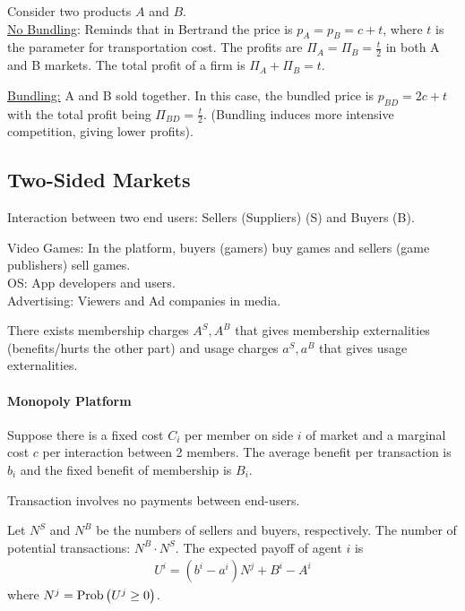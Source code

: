 \documentclass[11pt]{elegantbook}
\begin{document}
Consider two products $A$ and $B$.\\
\underline{No Bundling}: Reminds that in Bertrand the price is $p_A=p_B=c+t$, where $t$ is the parameter for transportation cost. The profits are $\Pi_A=\Pi_B=\frac{t}{2}$ in both A and B markets. The total profit of a firm is $\Pi_A+\Pi_B=t$.

\underline{Bundling:} A and B sold together. In this case, the bundled price is $p_{BD}=2c+t$ with the total profit being $\Pi_{BD}=\frac{t}{2}$. (Bundling induces more intensive competition, giving lower profits).

\subsection{Two-Sided Markets}
Interaction between two end users: Sellers (Suppliers) (S) and Buyers (B).
\begin{example}
    Video Games: In the platform, buyers (gamers) buy games and sellers (game publishers) sell games.\\
    OS: App developers and users.\\
    Advertising: Viewers and Ad companies in media.
\end{example}

There exists membership charges $A^S,A^B$ that gives membership externalities (benefits/hurts the other part) and usage charges $a^S,a^B$ that gives usage externalities.

\paragraph*{Monopoly Platform}
Suppose there is a fixed cost $C_i$ per member on side $i$ of market and a marginal cost $c$ per interaction between 2 members. The average benefit per transaction is $b_i$ and the fixed benefit of membership is $B_i$.
\begin{assumption}
    Transaction involves no payments between end-users.
\end{assumption}
Let $N^S$ and $N^B$ be the numbers of sellers and buyers, respectively. The number of potential transactions: $N^B\cdot N^S$. The expected payoff of agent $i$ is
\begin{equation}
    \begin{aligned}
        U^i=(b^i-a^i)N^j+B^i-A^i
    \end{aligned}
    \nonumber
\end{equation}
where $N^j=\textnormal{Prob}\left(U^j\geq 0\right)$.
\end{document}
